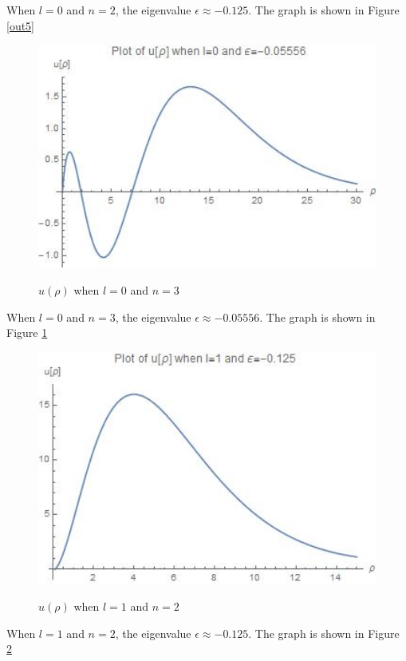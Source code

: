 \documentclass[12pt]{article}
\begin{document}
\begin{spacing}{2.0}
When $l=0$ and $n=2$, the eigenvalue $\epsilon \approx -0.125$. The graph is shown in Figure \ref{out5}

\begin{figure}
  \centering
  \includegraphics[width=4.5in]{out6}\\
  \caption{$u(\rho)$ when $l=0$ and $n=3$}\label{out6}
\end{figure}

When $l=0$ and $n=3$, the eigenvalue $\epsilon \approx -0.05556$. The graph is shown in Figure \ref{out6}\\

\begin{figure}
  \centering
  \includegraphics[width=4.5in]{out7}\\
  \caption{$u(\rho)$ when $l=1$ and $n=2$}\label{out7}
\end{figure}

When $l=1$ and $n=2$, the eigenvalue $\epsilon \approx -0.125$. The graph is shown in Figure \ref{out7}


\end{spacing}
\end{document}
